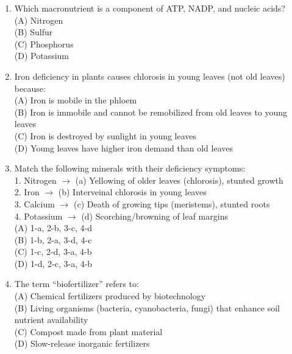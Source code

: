 \documentclass{article}
\begin{document}
\begin{enumerate}[label=Q\arabic*.]
\item Which macronutrient is a component of ATP, NADP, and nucleic acids?
\\(A) Nitrogen
\\(B) Sulfur
\\(C) Phosphorus
\\(D) Potassium

\item Iron deficiency in plants causes chlorosis in young leaves (not old leaves) because:
\\(A) Iron is mobile in the phloem
\\(B) Iron is immobile and cannot be remobilized from old leaves to young leaves
\\(C) Iron is destroyed by sunlight in young leaves
\\(D) Young leaves have higher iron demand than old leaves

\item Match the following minerals with their deficiency symptoms:\\
1. Nitrogen $\rightarrow$ (a) Yellowing of older leaves (chlorosis), stunted growth\\
2. Iron $\rightarrow$ (b) Interveinal chlorosis in young leaves\\
3. Calcium $\rightarrow$ (c) Death of growing tips (meristems), stunted roots\\
4. Potassium $\rightarrow$ (d) Scorching/browning of leaf margins
\\(A) 1-a, 2-b, 3-c, 4-d
\\(B) 1-b, 2-a, 3-d, 4-c
\\(C) 1-c, 2-d, 3-a, 4-b
\\(D) 1-d, 2-c, 3-a, 4-b

\item The term ``biofertilizer'' refers to:
\\(A) Chemical fertilizers produced by biotechnology
\\(B) Living organisms (bacteria, cyanobacteria, fungi) that enhance soil nutrient availability
\\(C) Compost made from plant material
\\(D) Slow-release inorganic fertilizers

\end{enumerate}
\end{document}
